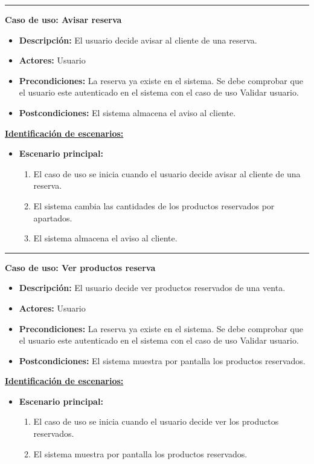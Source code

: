 \smallskip
\hrule height 1pt
\smallskip
\smallskip
\textbf{Caso de uso: Avisar reserva}
\begin{itemize}\renewcommand{\labelitemi}{$\cdot$}
 \item \textbf{Descripción:} El usuario decide avisar al cliente de una reserva.
  \item \textbf{Actores:} Usuario
  \item \textbf{Precondiciones:} La reserva ya existe en el sistema. Se debe comprobar que el usuario este autenticado en el sistema con el caso de uso Validar usuario.
  \item \textbf{Postcondiciones:} El sistema almacena el aviso al cliente.
\end{itemize}
\underline{\textbf{Identificación de escenarios:}}
\begin{itemize}\renewcommand{\labelitemi}{$\circ$}
 \item \textbf{Escenario principal:}
         \begin{enumerate}
          \item El caso de uso se inicia cuando el usuario decide avisar al cliente de una reserva.
	  \item El sistema cambia las cantidades de los productos reservados por apartados.
	  \item El sistema almacena el aviso al cliente.
         \end{enumerate}
\end{itemize}

\smallskip
\hrule height 1pt
\smallskip
\textbf{Caso de uso: Ver productos reserva}
\begin{itemize}\renewcommand{\labelitemi}{$\cdot$}
 \item \textbf{Descripción:} El usuario decide ver productos reservados de una venta.
  \item \textbf{Actores:} Usuario
  \item \textbf{Precondiciones:} La reserva ya existe en el sistema. Se debe comprobar que el usuario este autenticado en el sistema con el caso de uso Validar usuario.
  \item \textbf{Postcondiciones:} El sistema muestra por pantalla los productos reservados.
\end{itemize}
\underline{\textbf{Identificación de escenarios:}}
\begin{itemize}\renewcommand{\labelitemi}{$\circ$}
 \item \textbf{Escenario principal:}
         \begin{enumerate}
          \item El caso de uso se inicia cuando el usuario decide ver los productos reservados.
	  \item El sistema muestra por pantalla los productos reservados.
         \end{enumerate}
\end{itemize}

